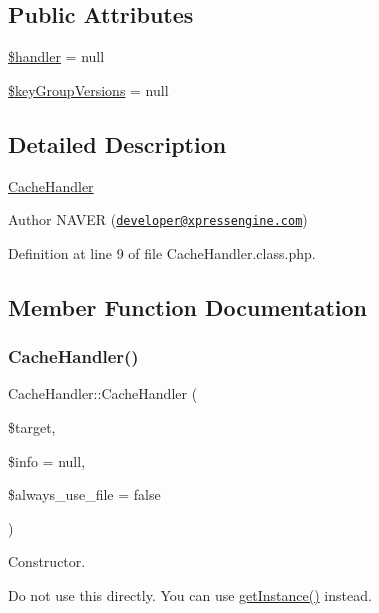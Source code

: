 \subsection*{Public Attributes}
\begin{DoxyCompactItemize}
\item 
\hyperlink{classCacheHandler_a390b49c673a6fc10e7091abaca857905}{\$handler} = null
\item 
\hyperlink{classCacheHandler_a1e71d92d2d7a76b72b3415389bbcaf60}{\$key\+Group\+Versions} = null
\end{DoxyCompactItemize}


\subsection{Detailed Description}
\hyperlink{classCacheHandler}{Cache\+Handler}

\begin{DoxyAuthor}{Author}
N\+A\+V\+ER (\href{mailto:developer@xpressengine.com}{\tt developer@xpressengine.\+com}) 
\end{DoxyAuthor}


Definition at line 9 of file Cache\+Handler.\+class.\+php.



\subsection{Member Function Documentation}
\hypertarget{classCacheHandler_a71cb13c8791b73a8153fd5bbc7aba3e3}{}\label{classCacheHandler_a71cb13c8791b73a8153fd5bbc7aba3e3} 
\subsubsection{\texorpdfstring{Cache\+Handler()}{CacheHandler()}}
{\footnotesize\ttfamily Cache\+Handler\+::\+Cache\+Handler (\begin{DoxyParamCaption}\item[{}]{\$target,  }\item[{}]{\$info = {\ttfamily null},  }\item[{}]{\$always\+\_\+use\+\_\+file = {\ttfamily false} }\end{DoxyParamCaption})}

Constructor.

Do not use this directly. You can use \hyperlink{classCacheHandler_af6194e9a8be860303f799d8d82757397}{get\+Instance()} instead.

